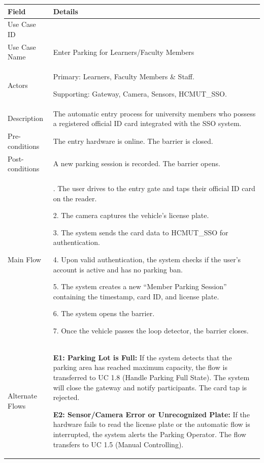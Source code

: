 \begin{table}[H]
\small
\renewcommand{\arraystretch}{1.4}
\begin{tabularx}{\textwidth}{|>{\raggedright\arraybackslash}p{3.5cm}|>{\RaggedRight\arraybackslash}X|}
\hline
\rowcolor{gray!20} \textbf{Field} & \textbf{Details} \\
\hline
Use Case ID & 1.1 \\
\hline
Use Case Name & Enter Parking for Learners/Faculty Members \\
\hline
Actors & Primary: Learners, Faculty Members \& Staff. \par Supporting: Gateway, Camera, Sensors, HCMUT\_SSO. \\
\hline
Description & The automatic entry process for university members who possess a registered official ID card integrated with the SSO system. \\
\hline
Pre-conditions & The entry hardware is online. The barrier is closed. \\
\hline
Post-conditions & A new parking session is recorded. The barrier opens. \\
\hline
Main Flow & 
1. The user drives to the entry gate and taps their official ID card on the reader. \par
2. The camera captures the vehicle's license plate. \par
3. The system sends the card data to HCMUT\_SSO for authentication. \par
4. Upon valid authentication, the system checks if the user's account is active and has no parking ban. \par
5. The system creates a new ``Member Parking Session'' containing the timestamp, card ID, and license plate. \par
6. The system opens the barrier. \par
7. Once the vehicle passes the loop detector, the barrier closes. \\
\hline
Alternate Flows & 
\textbf{E1: Parking Lot is Full:} If the system detects that the parking area has reached maximum capacity, the flow is transferred to UC 1.8 (Handle Parking Full State). The system will close the gateway and notify participants. The card tap is rejected. \par \vspace{0.5em}
\textbf{E2: Sensor/Camera Error or Unrecognized Plate:} If the hardware fails to read the license plate or the automatic flow is interrupted, the system alerts the Parking Operator. The flow transfers to UC 1.5 (Manual Controlling). \par \vspace{0.5em}

\end{tabularx}
\end{table}

